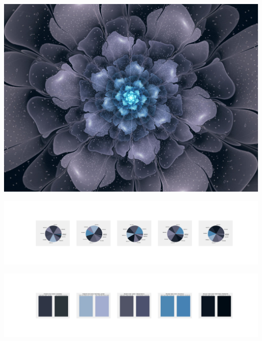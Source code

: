 \documentclass[11pt]{article}
\begin{document}
\begin{landscape}
    \begin{center}
    \includegraphics[width=\textwidth]{./nbimg/file (149).jpg}
    \end{center}

    \begin{center}
    \includegraphics[width=250mm]{./nbimg/pie-55.jpg}
    \end{center}

    \begin{center}
    \includegraphics[width=250mm]{./nbimg/peak-55.jpg}
    \end{center}
    


\end{landscape}
\end{document}

